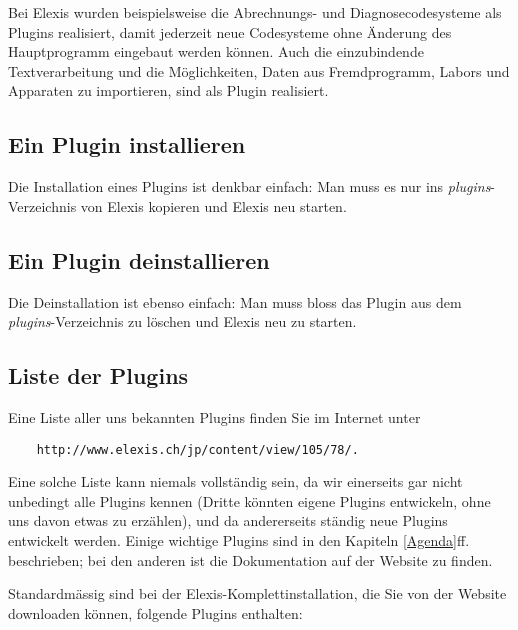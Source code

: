 Bei Elexis wurden beispielsweise die Abrechnungs- und Diagnosecodesysteme als Plugins realisiert, damit jederzeit neue Codesysteme ohne Änderung des Hauptprogramm eingebaut werden können. Auch die einzubindende Textverarbeitung und die Möglichkeiten, Daten aus Fremdprogramm, Labors und Apparaten zu importieren, sind als Plugin realisiert.

\subsection{Ein Plugin installieren}
Die Installation eines Plugins ist denkbar einfach: Man muss es nur ins \textit{plugins}-Verzeichnis von Elexis kopieren und Elexis neu starten.

\subsection{Ein Plugin deinstallieren}
Die Deinstallation ist ebenso einfach: Man muss bloss das Plugin aus dem \textit{plugins}-Verzeichnis zu löschen und Elexis neu zu starten.

\subsection{Liste der Plugins}
Eine Liste aller uns bekannten Plugins finden Sie im Internet unter 
\begin{verbatim}
    http://www.elexis.ch/jp/content/view/105/78/.
\end{verbatim}
Eine solche Liste kann niemals vollständig sein, da wir einerseits gar nicht unbedingt alle Plugins kennen (Dritte könnten eigene Plugins entwickeln, ohne uns davon etwas zu erzählen), und da andererseits ständig neue Plugins entwickelt werden. Einige wichtige Plugins sind in den Kapiteln \ref{Agenda}ff. beschrieben; bei den anderen ist die Dokumentation auf der Website zu finden. 


\medskip

Standardmässig sind bei der Elexis-Komplettinstallation, die Sie von der Website downloaden können, folgende Plugins enthalten:

